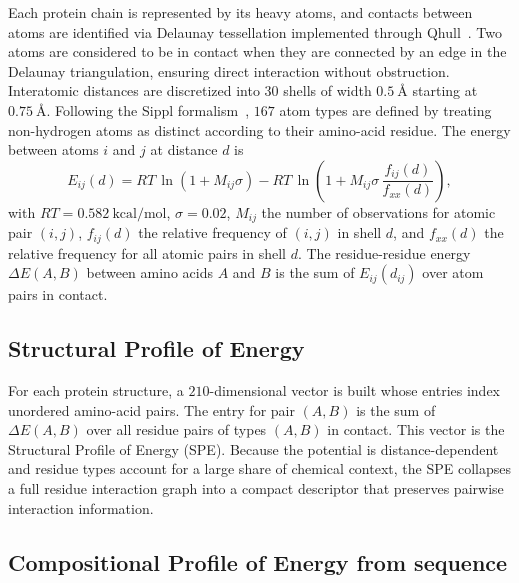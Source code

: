 \documentclass[11pt]{article}
\begin{document}
Each protein chain is represented by its heavy atoms, and contacts between
atoms are identified via Delaunay tessellation implemented through
Qhull~\citep{barber1996qhull}. Two atoms are considered to be in contact when
they are connected by an edge in the Delaunay triangulation, ensuring direct
interaction without obstruction. Interatomic distances are discretized into
$30$ shells of width $0.5~\si{\angstrom}$ starting at $0.75~\si{\angstrom}$.
Following the Sippl formalism~\citep{sippl1990potential,koppensteiner1998knowledge},
$167$ atom types are defined by treating non-hydrogen atoms as distinct
according to their amino-acid residue. The energy between atoms $i$ and $j$
at distance $d$ is
\begin{equation}
  E_{ij}(d) = RT \, \ln \left( 1 + M_{ij}\sigma \right) - RT \, \ln \left(1 + M_{ij}\sigma\, \dfrac{f_{ij}(d)}{f_{xx}(d)} \right),
  \label{eq:sippl}
\end{equation}
with $RT = 0.582~\text{kcal/mol}$, $\sigma = 0.02$, $M_{ij}$ the number of
observations for atomic pair $(i,j)$, $f_{ij}(d)$ the relative frequency of
$(i,j)$ in shell $d$, and $f_{xx}(d)$ the relative frequency for all atomic
pairs in shell $d$. The residue-residue energy $\Delta E(A,B)$ between amino
acids $A$ and $B$ is the sum of $E_{ij}(d_{ij})$ over atom pairs in contact.

\subsection{Structural Profile of Energy}

For each protein structure, a $210$-dimensional vector is built whose entries
index unordered amino-acid pairs. The entry for pair $(A,B)$ is the sum of
$\Delta E(A,B)$ over all residue pairs of types $(A,B)$ in contact. This
vector is the Structural Profile of Energy (SPE). Because the potential is
distance-dependent and residue types account for a large share of chemical
context, the SPE collapses a full residue interaction graph into a compact
descriptor that preserves pairwise interaction information.

\subsection{Compositional Profile of Energy from sequence}
\end{document}
